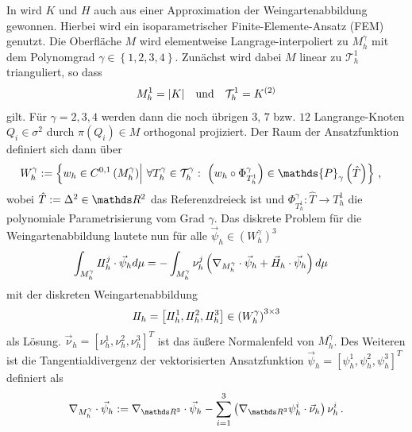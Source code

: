   In \cite{heine} wird \( K \) und \( H \) auch aus einer Approximation der Weingartenabbildung gewonnen.
  Hierbei wird ein isoparametrischer Finite-Elemente-Ansatz (FEM) genutzt. 
  Die Oberfläche \( M \) wird elementweise Langrage-interpoliert zu \( M^{\gamma}_{h} \) mit dem Polynomgrad \( \gamma\in\left\{ 1,2,3,4 \right\} \).
  Zunächst wird dabei \( M \) linear zu \(\mathcal{T}^{1}_{h}  \) trianguliert, so dass
  \begin{align}
     M_{h}^{1} = |K|  \quad\text{und}\quad
     \mathcal{T}^{1}_{h} = K^{(2)}
  \end{align}
  gilt.
  Für \( \gamma = 2,3,4 \) werden dann die noch übrigen \( 3 \), \( 7 \) bzw. \( 12 \) Langrange-Knoten \( Q_{i}\in\sigma^{2} \) durch \( \pi\left( Q_{i} \right)\in M \) orthogonal projiziert.
  Der Raum der Ansatzfunktion definiert sich dann über
  \begin{align}
    W_{h}^{\gamma} 
      &:= \left\{ w_{h}\in C^{0,1}\left( M_{h}^{\gamma} \right) \middle|\  
                          \forall T_{h}^{\gamma} \in \mathcal{T}_{h}^{\gamma}:\  \left( w_{h} \circ \Phi_{T_{h}^{1}}^{\gamma}\right) \in \mathds{P}_{\gamma}\left(\hat{T}\right)\right\}
                          \formkomma
  \end{align}
  wobei \( \hat{T}:=\Delta^{2}\in\R^{2} \) das Referenzdreieck ist und 
  \( \Phi_{T_{h}^{1}}^{\gamma}: \hat{T} \rightarrow T_{h}^{1} \)
  die polynomiale Parametrisierung vom Grad \( \gamma \).
  Das diskrete Problem für die Weingartenabbildung lautete nun für alle \( \vec{\psi}_{h}\in \left( W_{h}^{\gamma} \right)^{3} \)
  \begin{align}
    \int_{M_{h}^{\gamma}} I \! I_{h}^{j} \cdot \vec{\psi}_{h} d\mu
        &= -\int_{M_{h}^{\gamma}} \nu_{h}^{j} \left( \nabla_{M_{h}^{\gamma}} \cdot \vec{\psi}_{h} + \vec{H}_{h}\cdot\vec{\psi}_{h} \right) d\mu
  \end{align}
  mit der diskreten Weingartenabbildung 
  \begin{align}
    I \! I_{h} = \left[ I \! I_{h}^{1}, I \! I_{h}^{2}, I \! I_{h}^{3} \right] \in \left( W_{h}^{\gamma} \right)^{3 \times 3}
  \end{align}
  als Lösung.
  \( \vec{\nu}_{h}=\left[ \nu_{h}^{1}, \nu_{h}^{2}, \nu_{h}^{3} \right]^{T} \) ist das äußere Normalenfeld von \( M_{h}^{\gamma} \).
  Des Weiteren ist die Tangentialdivergenz der vektorisierten Ansatzfunktion \( \vec{\psi}_{h} = \left[ \psi_{h}^{1}, \psi_{h}^{2}, \psi_{h}^{3} \right]^{T} \) definiert als
  \begin{align}
    \nabla_{M_{h}^{\gamma}} \cdot \vec{\psi}_{h} := \nabla_{\R^{3}} \cdot \vec{\psi}_{h} 
                          - \sum_{i=1}^{3 }\left( \nabla_{\R^{3}}\psi_{h}^{i} \cdot \vec{\nu}_{h} \right) \nu_{h}^{i} \formpunkt
  \end{align}
